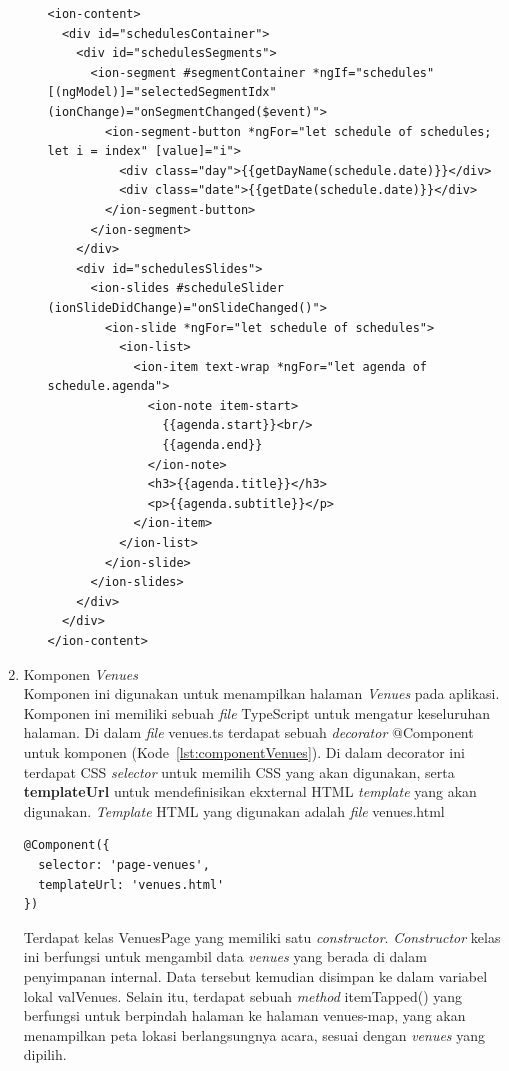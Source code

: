 \begin{enumerate}
\begin{itemize}
\begin{lstlisting}[label={lst:contentSchedule}, caption=\textit{Content} pada schedule.html]
<ion-content>
  <div id="schedulesContainer">
    <div id="schedulesSegments">
      <ion-segment #segmentContainer *ngIf="schedules" [(ngModel)]="selectedSegmentIdx" (ionChange)="onSegmentChanged($event)">
        <ion-segment-button *ngFor="let schedule of schedules; let i = index" [value]="i">
          <div class="day">{{getDayName(schedule.date)}}</div>
          <div class="date">{{getDate(schedule.date)}}</div>
        </ion-segment-button>
      </ion-segment>
    </div>
    <div id="schedulesSlides">
      <ion-slides #scheduleSlider (ionSlideDidChange)="onSlideChanged()">
        <ion-slide *ngFor="let schedule of schedules">
          <ion-list>
            <ion-item text-wrap *ngFor="let agenda of schedule.agenda">
              <ion-note item-start>
                {{agenda.start}}<br/>
                {{agenda.end}}
              </ion-note>
              <h3>{{agenda.title}}</h3>
              <p>{{agenda.subtitle}}</p>
            </ion-item>
          </ion-list>
        </ion-slide>
      </ion-slides>
    </div>
  </div>
</ion-content>
\end{lstlisting} 
		
	\end{itemize}
	
	\newpage

	\item Komponen \textit{Venues} \\
	Komponen ini digunakan untuk menampilkan halaman \textit{Venues} pada aplikasi. Komponen ini memiliki sebuah \textit{file} TypeScript untuk mengatur keseluruhan halaman. Di dalam \textit{file} venues.ts terdapat sebuah \textit{decorator} @Component untuk komponen (Kode~\ref{lst:componentVenues}). Di dalam decorator ini terdapat CSS \textit{selector} untuk memilih CSS yang akan digunakan, serta \textbf{templateUrl} untuk mendefinisikan ekxternal HTML \textit{template} yang akan digunakan. \textit{Template} HTML yang digunakan adalah \textit{file} venues.html
	
\begin{lstlisting}[label={lst:componentVenues}, caption=@Component pada venues.ts]
@Component({
  selector: 'page-venues',
  templateUrl: 'venues.html'
})
\end{lstlisting}

	Terdapat kelas VenuesPage yang memiliki satu \textit{constructor}. \textit{Constructor} kelas ini berfungsi untuk mengambil data \textit{venues} yang berada di dalam penyimpanan internal. Data tersebut kemudian disimpan ke dalam variabel lokal valVenues. Selain itu, terdapat sebuah \textit{method} itemTapped() yang berfungsi untuk berpindah halaman ke halaman venues-map, yang akan menampilkan peta lokasi berlangsungnya acara, sesuai dengan \textit{venues} yang dipilih.


\end{enumerate}
